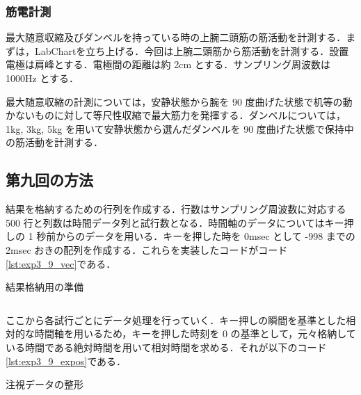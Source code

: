 \documentclass[dvipdfmx, titlepage, t]{jsarticle}
\begin{document}
    \subsubsection{筋電計測}
    最大随意収縮及びダンベルを持っている時の上腕二頭筋の筋活動を計測する．まずは，LabChartを立ち上げる．今回は上腕二頭筋から筋活動を計測する．設置電極は肩峰とする．電極間の距離は約 2cm とする．サンプリング周波数は 1000Hz とする．

    最大随意収縮の計測については，安静状態から腕を 90 度曲げた状態で机等の動かないものに対して等尺性収縮で最大筋力を発揮する．ダンベルについては，1kg, 3kg, 5kg を用いて安静状態から選んだダンベルを 90 度曲げた状態で保持中の筋活動を計測する．

    \subsection{第九回の方法}
    結果を格納するための行列を作成する．行数はサンプリング周波数に対応する 500 行と列数は時間データ列と試行数となる．時間軸のデータについてはキー押しの 1 秒前からのデータを用いる．キーを押した時を 0msec として -998 までの 2msec おきの配列を作成する．これらを実装したコードがコード\ref{lst:exp3_9_vec}である．
    
    \begin{program}
        \caption{結果格納用の準備}
        \inputminted[linenos,
        firstline=1,
        lastline=11,
        frame=lines,
        fontsize = \small]{matlab}{code/Exp3_9_Matlab.m}
        \label{lst:exp3_9_vec}
    \end{program}

    ここから各試行ごとにデータ処理を行っていく．キー押しの瞬間を基準とした相対的な時間軸を用いるため，キーを押した時刻を 0 の基準として，元々格納している時間である絶対時間を用いて相対時間を求める．それが以下のコード\ref{lst:exp3_9_expos}である．
    \begin{program}[H]
        \caption{注視データの整形}
        \inputminted[linenos,
        firstline=18,
        lastline=27,
        frame=lines,
        fontsize = \small]{matlab}{code/Exp3_9_Matlab.m}
        \label{lst:exp3_9_expos}
    \end{program}
\end{document}
